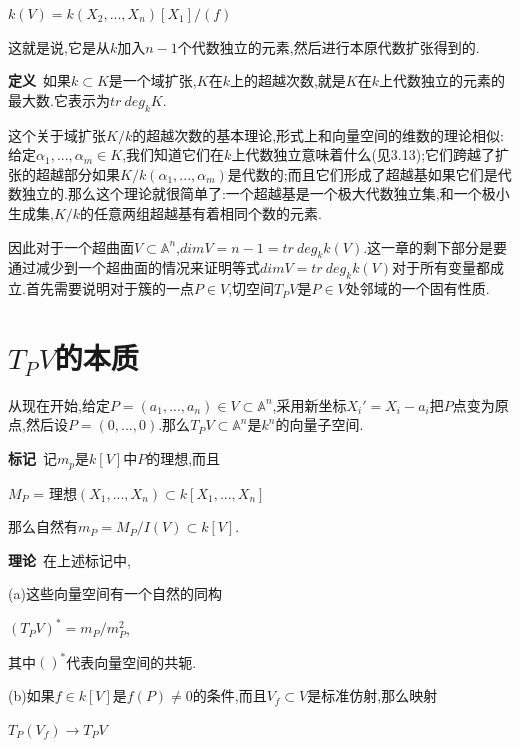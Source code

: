 \documentclass[UTF8]{book}
\begin{document}
\begin{center}
	$k(V)=k(X_{2},...,X_{n})[X_{1}]/(f)$
\end{center}


这就是说,它是从$ k $加入$ n-1 $个代数独立的元素,然后进行本原代数扩张得到的.


\textbf{定义}\ 如果$k\subset K$是一个域扩张,$ K $在$ k $上的超越次数,就是$ K $在$ k $上代数独立的元素的最大数.它表示为$tr\ deg_{k} {K}$.


这个关于域扩张$K/k$的超越次数的基本理论,形式上和向量空间的维数的理论相似:给定$\alpha_{1},...,\alpha_{m}\in K$,我们知道它们在$ k $上代数独立意味着什么(见3.13);它们跨越了扩张的超越部分如果$K/k(\alpha_{1},...,\alpha_{m})$是代数的;而且它们形成了超越基如果它们是代数独立的.那么这个理论就很简单了:一个超越基是一个极大代数独立集,和一个极小生成集,$ K/k $的任意两组超越基有着相同个数的元素.


因此对于一个超曲面$V\subset\mathbb{A}^{n}$,$dim V = n-1 = tr\ deg_{k}k(V)$.这一章的剩下部分是要通过减少到一个超曲面的情况来证明等式$dim V = tr\ deg_{k}k(V)$对于所有变量都成立.首先需要说明对于簇的一点$P\in V$,切空间$T_{P}V$是$P\in V$处邻域的一个固有性质.


\section{$T_{P}V$的本质}
从现在开始,给定$P = (a_{1},...,a_{n})\in V\subset \mathbb{A}^{n}$,采用新坐标$X_{i}' = X_{i}-a_{i}$把$ P $点变为原点,然后设$P = (0,...,0)$.那么$T_{P}V\subset \mathbb{A}^{n}$是$k^{n}$的向量子空间.


\textbf{标记}\ 记$m_{p}$是$ k[V] $中$ P $的理想,而且


\begin{center}
	$M_{P}$ = 理想$(X_{1},...,X_{n})\subset k[X_{1},...,X_{n}]$
\end{center}


那么自然有$m_{P} = M_{P}/I(V)\subset k[V]$.


\textbf{理论}\ 在上述标记中,


(a)这些向量空间有一个自然的同构


\begin{center}
	$(T_{P}V)^{*} = m_{P}/m_{P}^{2}$,
\end{center}


其中$ ()^{*} $代表向量空间的共轭.


(b)如果$f\in k[V]$是$f(P)\ne 0$的条件,而且$V_{f}\subset V$是标准仿射,那么映射


\begin{center}
	$T_{P}(V_{f})\rightarrow T_{P}V$
\end{center}
\end{document}
